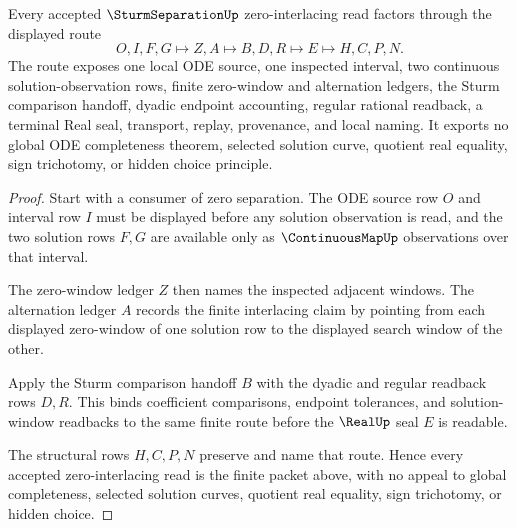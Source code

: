 \begin{theorem}
\label{thm:sturm-separation-zero-interlacing-route}
Every accepted $\SturmSeparationUp$ zero-interlacing read factors through the displayed route
$$
O,I,F,G \longmapsto Z,A \longmapsto B,D,R \longmapsto E \longmapsto H,C,P,N .
$$
The route exposes one local ODE source, one inspected interval, two continuous solution-observation rows, finite zero-window and alternation ledgers, the Sturm comparison handoff, dyadic endpoint accounting, regular rational readback, a terminal Real seal, transport, replay, provenance, and local naming. It exports no global ODE completeness theorem, selected solution curve, quotient real equality, sign trichotomy, or hidden choice principle.
\end{theorem}
\begin{proof}
Start with a consumer of zero separation. The ODE source row $O$ and interval row $I$ must be displayed before any solution observation is read, and the two solution rows $F,G$ are available only as $\ContinuousMapUp$ observations over that interval.

The zero-window ledger $Z$ then names the inspected adjacent windows. The alternation ledger $A$ records the finite interlacing claim by pointing from each displayed zero-window of one solution row to the displayed search window of the other.

Apply the Sturm comparison handoff $B$ with the dyadic and regular readback rows $D,R$. This binds coefficient comparisons, endpoint tolerances, and solution-window readbacks to the same finite route before the $\RealUp$ seal $E$ is readable.

The structural rows $H,C,P,N$ preserve and name that route. Hence every accepted zero-interlacing read is the finite packet above, with no appeal to global completeness, selected solution curves, quotient real equality, sign trichotomy, or hidden choice.
\end{proof}



